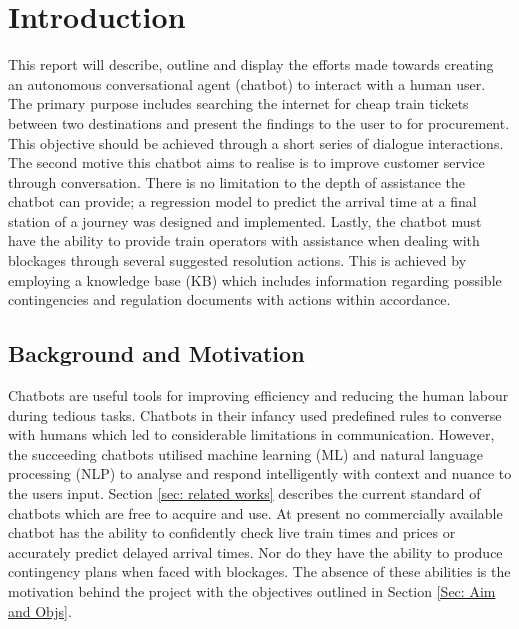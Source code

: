 \section{Introduction}
This report will describe, outline and display the efforts made towards creating an autonomous conversational agent (chatbot) to interact with a human user. The primary purpose includes searching the internet for cheap train tickets between two destinations and present the findings to the user to for procurement. This objective should be achieved through a short series of dialogue interactions. The second motive this chatbot aims to realise is to improve customer service through conversation. There is no limitation to the depth of assistance the chatbot can provide; a regression model to predict the arrival time at a final station of a journey was designed and implemented. Lastly, the chatbot must have the ability to provide train operators with assistance when dealing with blockages through several suggested resolution actions. This is achieved by employing a knowledge base (KB) which includes information regarding possible contingencies and regulation documents with actions within accordance.




\subsection{Background and Motivation}
Chatbots are useful tools for improving efficiency and reducing the human labour during tedious tasks. Chatbots in their infancy used predefined rules to converse with humans which led to considerable limitations in communication. However, the succeeding chatbots utilised machine learning (ML) and natural language processing (NLP) to analyse and respond intelligently with context and nuance to the users input. Section \ref{sec: related works} describes the current standard of chatbots which are free to acquire and use. At present no commercially available chatbot has the ability to confidently check live train times and prices or accurately predict delayed arrival times. Nor do they have the ability to produce contingency plans when faced with blockages. The absence of these abilities is the motivation behind the project with the objectives outlined in Section \ref{Sec: Aim and Objs}.


